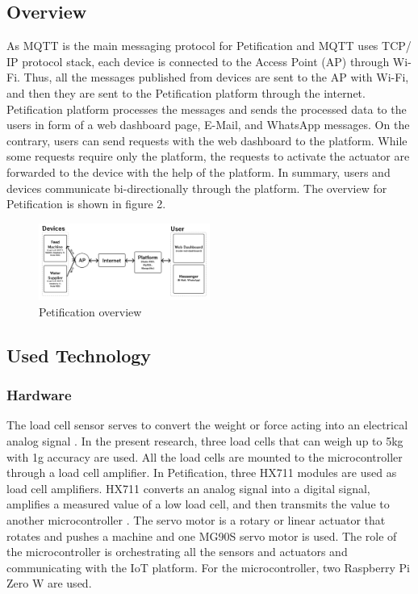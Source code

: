 \documentclass[conference]{IEEEtran}
\begin{document}
\subsection{Overview}
As MQTT is the main messaging protocol for Petification and MQTT uses TCP/ IP protocol stack, each device is connected to the Access Point (AP) through Wi-Fi. Thus, all the messages published from devices are sent to the AP with Wi-Fi, and then they are sent to the Petification platform through the internet. Petification platform processes the messages and sends the processed data to the users in form of a web dashboard page, E-Mail, and WhatsApp messages. On the contrary, users can send requests with the web dashboard to the platform. While some requests require only the platform, the requests to activate the actuator are forwarded to the device with the help of the platform. In summary, users and devices communicate bi-directionally through the platform. The overview for Petification is shown in figure 2.

\begin{figure}[htbp]
\centerline{\includegraphics[width=0.5\textwidth]{./images/Overview.png}}
\caption{Petification overview}
\label{fig}
\end{figure}

\subsection{Used Technology}
\subsubsection{Hardware}
The load cell sensor serves to convert the weight or force acting into an electrical analog signal \cite{b14}. In the present research, three load cells that can weigh up to 5kg with 1g accuracy are used.
All the load cells are mounted to the microcontroller through a load cell amplifier. In Petification, three HX711 modules are used as load cell amplifiers. HX711 converts an analog signal into a digital signal, amplifies a measured value of a low load cell, and then transmits the value to another microcontroller \cite{b15}. 
The servo motor is a rotary or linear actuator that rotates and pushes a machine \cite{b16} and one MG90S servo motor is used.
The role of the microcontroller is orchestrating all the sensors and actuators and communicating with the IoT platform. For the microcontroller, two Raspberry Pi Zero W are used.
\end{document}
